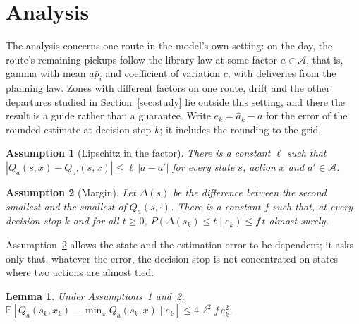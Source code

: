 \documentclass[preprint,authoryear,12pt]{elsarticle}
\newtheorem{assumption}{Assumption}
\newtheorem{lemma}{Lemma}
\newcommand{\E}{\mathbb{E}}
\begin{document}
\begin{table}[t]
\centering\footnotesize
\caption{Wall-clock times, first five instances of each family (one
core). Library: off-line build of all $16K$ policies, range over
instances. Posterior: mean time of one evaluation of the zone posterior
means. Variances: mean time of the moment estimates from 60 past
days.}\label{tab:timing}

\end{table}

\section{Analysis}\label{sec:theory}

The analysis concerns one route in the model's own setting: on the day,
the route's remaining pickups follow the library law at some factor
$a \in \mathcal{A}$, that is, gamma with mean $a\bar p_i$ and
coefficient of variation $c$, with deliveries from the planning law.
Zones with different factors on one route, drift and the other
departures studied in Section~\ref{sec:study} lie outside this setting,
and there the result is a guide rather than a guarantee. Write
$e_k = \hat a_k - a$ for the error of the rounded estimate at decision
stop $k$; it includes the rounding to the grid.

\begin{assumption}[Lipschitz in the factor]\label{ass:lip}
There is a constant $\ell$ such that $|Q_a(s,x) - Q_{a'}(s,x)| \le
\ell\,|a-a'|$ for every state $s$, action $x$ and $a' \in \mathcal{A}$.
\end{assumption}

\begin{assumption}[Margin]\label{ass:margin}
Let $\Delta(s)$ be the difference between the second smallest and the
smallest of $Q_a(s,\cdot)$. There is a constant $f$ such that, at every
decision stop $k$ and for all $t \ge 0$,
$P(\Delta(s_k) \le t \mid e_k) \le f\,t$ almost surely.
\end{assumption}

Assumption~\ref{ass:margin} allows the state and the estimation error
to be dependent; it asks only that, whatever the error, the decision
stop is not concentrated on states where two actions are almost tied.

\begin{lemma}\label{lem:one}
Under Assumptions~\ref{ass:lip} and~\ref{ass:margin},
$\E[Q_a(s_k,x_k) - \min_x Q_a(s_k,x) \mid e_k] \le 4\,\ell^2
f\, e_k^2$.
\end{lemma}
\end{document}
